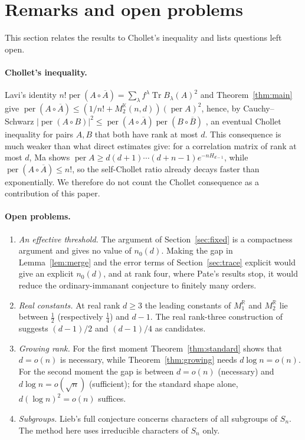 \documentclass[11pt,a4paper]{article}
\theoremstyle{remark}
\newcommand{\per}{\operatorname{per}}
\newcommand{\Tr}{\operatorname{Tr}}
\newcommand{\R}{\mathbb R}
\newcommand{\K}{\mathbb K}
\begin{document}
\section{Remarks and open problems}\label{sec:remarks}
This section relates the results to Chollet's inequality and lists questions left open.

\paragraph{Chollet's inequality.} Lavi's identity $n!\per(A\circ\overline A)=\sum_\lambda f^\lambda\Tr B_\lambda(A)^2$ \cite[eq.~(2.5)]{Lavi} and Theorem~\ref{thm:main} give $\per(A\circ\overline A)\le(1/n!+M_2^\K(n,d))(\per A)^2$, hence, by Cauchy--Schwarz $|\per(A\circ B)|^2\le\per(A\circ\overline A)\per(B\circ\overline B)$ \cite[eq.~(2.6)]{Lavi}, an eventual Chollet inequality for pairs $A,B$ that both have rank at most $d$. This consequence is much weaker than what direct estimates give: for a correlation matrix of rank at most $d$, Ma \cite[Lemma~3.1]{Ma} shows $\per A\ge d(d+1)\cdots(d+n-1)e^{-nH_{d-1}}$, while $\per(A\circ\overline A)\le n!$, so the self-Chollet ratio already decays faster than exponentially. We therefore do not count the Chollet consequence as a contribution of this paper.

\paragraph{Open problems.}
\begin{enumerate}
\item \emph{An effective threshold.} The argument of Section~\ref{sec:fixed} is a compactness argument and gives no value of $n_0(d)$. Making the gap in Lemma~\ref{lem:merge} and the error terms of Section~\ref{sec:trace} explicit would give an explicit $n_0(d)$, and at rank four, where Pate's results stop, it would reduce the ordinary-immanant conjecture to finitely many orders.
\item \emph{Real constants.} At real rank $d\ge3$ the leading constants of $M_1^\R$ and $M_2^\R$ lie between $\frac12$ (respectively $\frac14$) and $d-1$. The real rank-three construction of \cite{EPBS} suggests $(d-1)/2$ and $(d-1)/4$ as candidates.
\item \emph{Growing rank.} For the first moment Theorem~\ref{thm:standard} shows that $d=o(n)$ is necessary, while Theorem~\ref{thm:growing} needs $d\log n=o(n)$. For the second moment the gap is between $d=o(n)$ (necessary) and $d\log n=o(\sqrt n)$ (sufficient); for the standard shape alone, $d(\log n)^2=o(n)$ suffices.
\item \emph{Subgroups.} Lieb's full conjecture concerns characters of all subgroups of $S_n$. The method here uses irreducible characters of $S_n$ only.
\end{enumerate}
\end{document}
